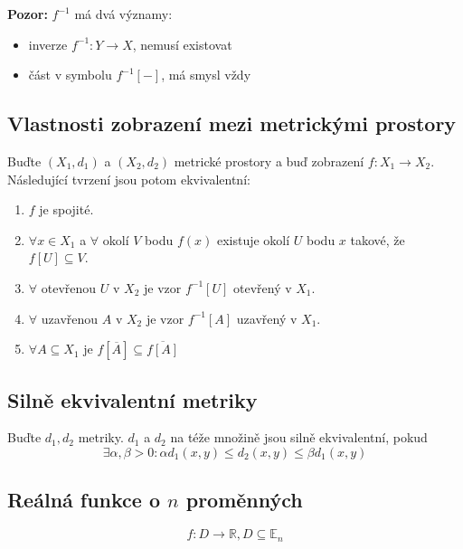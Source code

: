 \documentclass[../main.tex]{subfiles}
\begin{document}
\noindent
\hspace{1.2mm}
\textbf{Pozor:} $f^{-1}$ má dvá významy:
\begin{itemize}
    \item inverze $f^{-1}:Y \rightarrow X$, nemusí existovat
    \item část v symbolu $f^{-1}[-]$, má smysl vždy
 
\end{itemize}
\noindent

\subsection{Vlastnosti zobrazení mezi metrickými prostory}
\hspace{1.2mm}
Buďte $(X_1, d_1)$ a $(X_2, d_2)$ metrické prostory a buď zobrazení $f: X_1 \to X_2$. Následující tvrzení
jsou potom ekvivalentní:
\begin{enumerate}
    \item $f$ je spojité.
    \item $\forall x \in X_1$ a $\forall$ okolí $V$ bodu $f(x)$ existuje okolí $U$ bodu $x$ takové, že
        $f[U] \subseteq V$.
    \item $\forall$ otevřenou $U$ v $X_2$ je vzor $f^{-1}[U]$ otevřený v $X_1$.
    \item $\forall$ uzavřenou $A$ v $X_2$ je vzor $f^{-1}[A]$ uzavřený v $X_1$.
    \item $\forall A \subseteq X_1$ je $f[\overline{A}] \subseteq \overline{f[A]}$
\end{enumerate}


\subsection{Silně ekvivalentní metriky}
\hspace{1.2mm}
Buďte $d_1, d_2$ metriky. $d_1$ a $d_2$ na téže množině jsou silně ekvivalentní, pokud
\[\exists \alpha , \beta > 0: \alpha d_1(x,y) \leq d_2(x,y) \leq \beta d_1(x,y)\]

\subsection{Reálná funkce o $n$ proměnných}
\hspace{1.2mm}
\[f: D \rightarrow \mathbb{R}, D \subseteq \mathbb{E}_n\]
\end{document}
